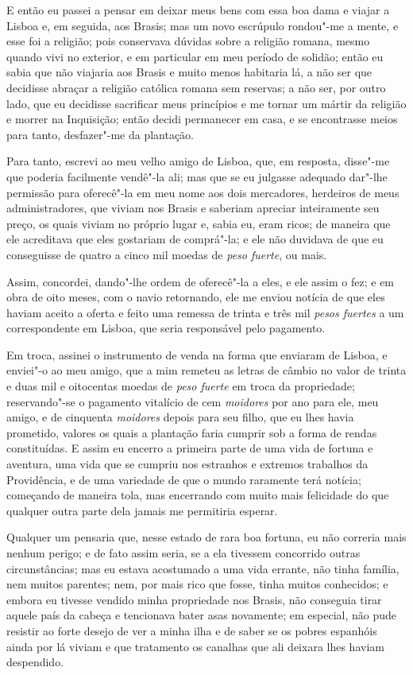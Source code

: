 E então eu passei a pensar em deixar meus bens com essa boa dama e
viajar a Lisboa e, em seguida, aos Brasis; mas um novo escrúpulo
rondou"-me a mente, e esse foi a religião; pois conservava dúvidas sobre
a religião romana, mesmo quando vivi no exterior, e em particular em meu
período de solidão; então eu sabia que não viajaria aos Brasis e muito
menos habitaria lá, a não ser que decidisse abraçar a religião católica
romana sem reservas; a não ser, por outro lado, que eu decidisse
sacrificar meus princípios e me tornar um mártir da religião e morrer na
Inquisição; então decidi permanecer em casa, e se encontrasse meios para
tanto, desfazer"-me da plantação.

Para tanto, escrevi ao meu velho amigo de Lisboa, que, em resposta,
disse"-me que poderia facilmente vendê"-la ali; mas que se eu julgasse
adequado dar"-lhe permissão para oferecê"-la em meu nome aos dois
mercadores, herdeiros de meus administradores, que viviam nos Brasis e
saberiam apreciar inteiramente seu preço, os quais viviam no próprio
lugar e, sabia eu, eram ricos; de maneira que ele acreditava que eles
gostariam de comprá"-la; e ele não duvidava de que eu conseguisse de
quatro a cinco mil moedas de \emph{peso fuerte}, ou mais.

Assim, concordei, dando"-lhe ordem de oferecê"-la a eles, e ele assim o
fez; e em obra de oito meses, com o navio retornando, ele me enviou
notícia de que eles haviam aceito a oferta e feito uma remessa de trinta
e três mil \emph{pesos fuertes} a um correspondente em Lisboa, que seria
responsável pelo pagamento.

Em troca, assinei o instrumento de venda na forma que enviaram de
Lisboa, e enviei"-o ao meu amigo, que a mim remeteu as letras de câmbio
no valor de trinta e duas mil e oitocentas moedas de \emph{peso fuerte}
em troca da propriedade; reservando"-se o pagamento vitalício de cem
\emph{moidores} por ano para ele, meu amigo, e de cinquenta
\emph{moidores} depois para seu filho, que eu lhes havia prometido,
valores os quais a plantação faria cumprir sob a forma de rendas
constituídas. E assim eu encerro a primeira parte de uma vida de fortuna
e aventura, uma vida que se cumpriu nos estranhos e extremos trabalhos
da Providência, e de uma variedade de que o mundo raramente terá
notícia; começando de maneira tola, mas encerrando com muito mais
felicidade do que qualquer outra parte dela jamais me permitiria
esperar.

Qualquer um pensaria que, nesse estado de rara boa fortuna, eu não
correria mais nenhum perigo; e de fato assim seria, se a ela tivessem
concorrido outras circunstâncias; mas eu estava acostumado a uma vida
errante, não tinha família, nem muitos parentes; nem, por mais rico que
fosse, tinha muitos conhecidos; e embora eu tivesse vendido minha
propriedade nos Brasis, não conseguia tirar aquele país da cabeça e
tencionava bater asas novamente; em especial, não pude resistir ao forte
desejo de ver a minha ilha e de saber se os pobres espanhóis ainda por
lá viviam e que tratamento os canalhas que ali deixara lhes haviam
despendido.

